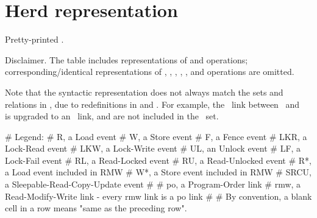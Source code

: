 \section{Herd representation}
\label{sec:docs:Herd representation}

\begin{Note}
  Pretty-printed .
\end{Note}

\begin{Note}
  Disclaimer.
  The table includes representations of  and  operations;
  corresponding/identical representations of , , ,
  , , and  operations are omitted.
\end{Note}

\begin{Note}
  Note that the syntactic representation does not always match the sets and
  relations in , due to redefinitions in
   and .
  For example, the ~link between~ and~ is upgraded
  to an ~link, and  are not included in the
  ~set.
\end{Note}

\begin{VerbatimU}[tabsize=8]
# Legend:
#	R,	a Load event
#	W,	a Store event
#	F,	a Fence event
#	LKR,	a Lock-Read event
#	LKW,	a Lock-Write event
#	UL,	an Unlock event
#	LF,	a Lock-Fail event
#	RL,	a Read-Locked event
#	RU,	a Read-Unlocked event
#	R*,	a Load event included in RMW
#	W*,	a Store event included in RMW
#	SRCU,	a Sleepable-Read-Copy-Update event
#
#	po,	a Program-Order link
#	rmw,	a Read-Modify-Write link - every rmw link is a po link
#
# By convention, a blank cell in a row means "same as the preceding row".
\end{VerbatimU}

\newcommand{\Dark}{\rowcolor{lightgray}}
\newcommand{\Extraspace}{\addlinespace[2pt]}

